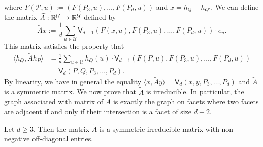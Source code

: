 \documentclass{puthesis-UG}
\begin{document}
where $F(\mathcal{P}, u) := (F(P_3, u), \ldots, F(P_d, u))$ and $x = h_Q - h_{Q'}$. We can define the matrix $\widetilde{A} : \mathbb{R}^\mathcal{U} \to \mathbb{R}^{\mathcal{U}}$ defined by 
\[
	\widetilde{A} x := \frac{1}{d} \sum_{u \in \mathcal{U}} \mathsf{V}_{d-1} (F(x, u), F(P_3, u), \ldots, F(P_d, u)) \cdot e_u.
\]
This matrix satisfies the property that 
\begin{align*}
	\langle h_Q, \widetilde{A} h_P \rangle & = \frac{1}{d} \sum_{u \in \mathcal{U}} h_Q(u) \cdot \mathsf{V}_{d-1} (F(P, u), F(P_3, u), \ldots, F(P_d, u)) \\
	& = \mathsf{V}_d (P, Q, P_3, \ldots, P_d).
\end{align*}
By linearity, we have in general the equality $\langle x, \widetilde{A} y \rangle = \mathsf{V}_d (x, y, P_3, \ldots, P_d)$ and $\widetilde{A}$ is a symmetric matrix. We now prove that $\widetilde{A}$ is irreducible. In particular, the graph associated with matrix of $\widetilde{A}$ is exactly the graph on facets where two facets are adjacent if and only if their intersection is a facet of size $d-2$. 

\begin{lem} \label{lemma-structure-of-matrix-widetilde-A}
	Let $d \geq 3$. Then the matrix $\widetilde{A}$ is a symmetric irreducible matrix with non-negative off-diagonal entries. 	
\end{lem}
\end{document}
